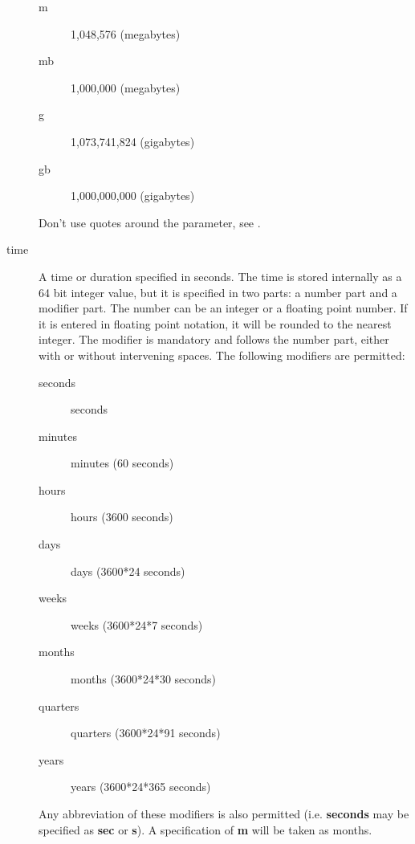 \begin{description}
\begin{description}
\item [m]
   1,048,576 (megabytes)

\item [mb]
   1,000,000 (megabytes)

\item [g]
   1,073,741,824 (gigabytes)

\item [gb]
   1,000,000,000 (gigabytes)
\end{description}

    Don't use quotes around the parameter, see .


\item [time]
    \label{DataTypeTime}
    \label{Time}
A time or duration specified in seconds.  The time is stored internally as
a 64 bit integer value, but it is specified in two parts: a number part and
a modifier part.  The number can be an integer or a floating point number.
If it is entered in floating point notation, it will be rounded to the
nearest integer.  The modifier is mandatory and follows the number part,
either with or without intervening spaces.  The following modifiers are
permitted:

\begin{description}

\item [seconds]
   seconds

\item [minutes]
   minutes (60 seconds)

\item [hours]
   hours (3600 seconds)

\item [days]
   days (3600*24 seconds)

\item [weeks]
   weeks (3600*24*7 seconds)

\item [months]
   months (3600*24*30 seconds)

\item [quarters]
   quarters (3600*24*91 seconds)

\item [years]
   years (3600*24*365 seconds)
\end{description}

Any abbreviation of these modifiers is also permitted (i.e.  {\bf seconds}
may be specified as {\bf sec} or {\bf s}).  A specification of {\bf m} will
be taken as months.


\end{description}
